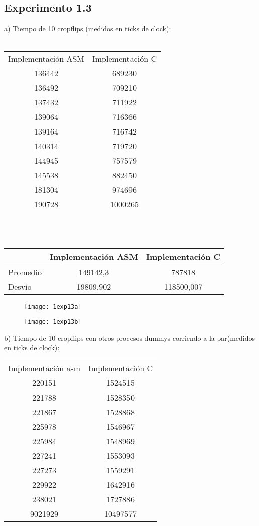 ﻿\documentclass[a4paper]{article}
\begin{document}
\subsection{Experimento 1.3}

a) Tiempo de 10 cropflips (medidos en ticks de clock): \\
\\
\indent
\begin{tabular}{ c c }
	Implementaci\'on ASM & Implementaci\'on C\\                       
  	136442 & 689230\\
	136492 & 709210\\
	137432 & 711922\\
	139064 & 716366\\
	139164 & 716742\\
	140314 & 719720\\
	144945 & 757579\\
	145538 & 882450\\
	181304 & 974696\\
	190728 & 1000265\\	  
\end{tabular}
\\\\
\indent
\begin{tabular}{| l | c | c |}
	\hline
			& Implementaci\'on ASM & Implementaci\'on C\\
			\hline
	Promedio	 &	149142,3 & 787818\\
	Desvío	 &	19809,902 & 118500,007\\
	\hline
\end{tabular}

\begin{figure}[h]
  \centering
    \texttt{[image: 1exp13a]}
\end{figure}

\begin{figure}[h]
  \centering
    \texttt{[image: 1exp13b]}
\end{figure}

\newpage
b) Tiempo de 10 cropflips con otros procesos dummys corriendo a la par(medidos en ticks de clock): \\
\indent

\begin{tabular}{ c c }
	Implementaci\'on asm & Implementaci\'on C\\                      
  	220151 & 1524515\\
	221788 & 1528350\\
	221867 & 1528868\\
	225978 & 1546967\\
	225984 & 1548969\\
	227241 & 1553093\\
	227273 & 1559291\\
	229922 & 1642916\\
	238021 & 1727886\\
	9021929 & 10497577\\
  
\end{tabular}
\end{document}
